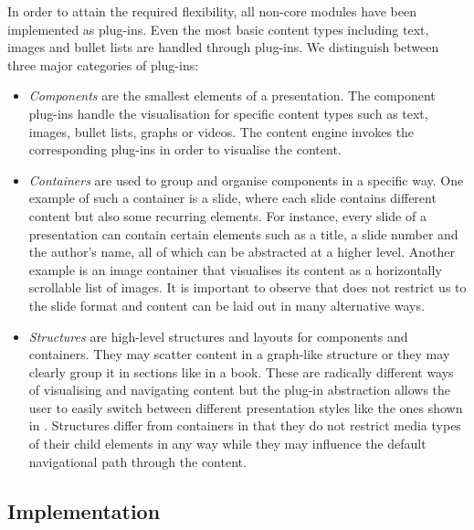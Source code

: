
    In order to attain the required flexibility, all non-core modules have been
    implemented as plug-ins. Even the most basic content types including text,
    images and bullet lists are handled through plug-ins. We distinguish
    between three major categories of plug-ins:

    \begin{itemize}

     \item \emph{Components} are the smallest elements of a presentation. The
     component plug-ins handle the visualisation for specific content types
     such as text, images, bullet lists, graphs or videos. The content engine
     invokes the corresponding plug-ins in order to visualise the content.

     \item \emph{Containers} are used to group and organise components in a
     specific way. One example of such a container is a slide, where each slide
     contains different content but also some recurring elements. For instance,
     every slide of a presentation can contain certain elements such as a
     title, a slide number and the author's name, all of which can be
     abstracted at a higher level. Another example is an image container that
     visualises its content as a horizontally scrollable list of images. It is
     important to observe that \mxp does not restrict us to the slide format
     and content can be laid out in many alternative ways.

     \item \emph{Structures} are high-level structures and layouts for
     components and containers. They may scatter content in a graph-like
     structure or they may clearly group it in sections like in a book. These
     are radically different ways of visualising and navigating content but the
     plug-in abstraction allows the user to easily switch between different
     presentation styles like the ones shown in .
     Structures differ from containers in that they do not restrict media types
     of their child elements in any way while they may influence the default
     navigational path through the content.

    \end{itemize}

   \subsection{Implementation}

